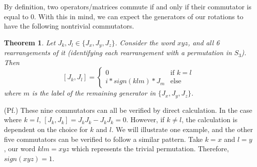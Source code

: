 \documentclass[10pt]{ucthesis}
\newtheorem{theorem}[definition]{Theorem}
\begin{document}
By definition, two operators/matrices commute if and only if their commutator is equal to $0$. With this in mind, we can expect the generators of our rotations to have the following nontrivial commutators.

\begin{theorem}
	Let $J_k,J_l \in \{J_x,J_y,J_z\}$. Consider the word $xyz$, and all 6 rearrangements of it (identifying each rearrangement with a permutation in $S_3$). Then 
$$[J_k , J_l] = \begin{cases}
					0 & \text{if }k = l \\
					i*sign(klm)*J_m& \text{else}
					\end{cases}$$
where $m$ is the label of the remaining generator in $\{J_x,J_y,J_z\}$.
\end{theorem}

\noindent(Pf.) These nine commutators can all be verified by direct calculation. In the case where $k=l$, $[J_k,J_k] = J_kJ_k - J_kJ_k = 0$. However, if $k\neq l$, the calculation is dependent on the choice for $k$ and $l$. We will illustrate one example, and the other five commutators can be verified to follow a similar pattern. Take $k=x$ and $l=y$, our word $klm=xyz$ which represents the trivial permutation. Therefore, $sign(xyz)=1$.
\end{document}

